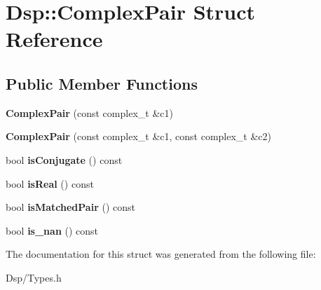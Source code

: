 \hypertarget{structDsp_1_1ComplexPair}{\section{Dsp\-:\-:Complex\-Pair Struct Reference}
\label{structDsp_1_1ComplexPair}
}
\subsection*{Public Member Functions}
\begin{DoxyCompactItemize}
\item 
\hypertarget{structDsp_1_1ComplexPair_a3bc3ac0d6dca14ea94ecb74f527ff28e}{{\bfseries Complex\-Pair} (const complex\-\_\-t \&c1)}\label{structDsp_1_1ComplexPair_a3bc3ac0d6dca14ea94ecb74f527ff28e}

\item 
\hypertarget{structDsp_1_1ComplexPair_a9ee530c01615a6d61330be1593e86157}{{\bfseries Complex\-Pair} (const complex\-\_\-t \&c1, const complex\-\_\-t \&c2)}\label{structDsp_1_1ComplexPair_a9ee530c01615a6d61330be1593e86157}

\item 
\hypertarget{structDsp_1_1ComplexPair_ac8d98cf07ef2c13a767c772b2fd55bda}{bool {\bfseries is\-Conjugate} () const }\label{structDsp_1_1ComplexPair_ac8d98cf07ef2c13a767c772b2fd55bda}

\item 
\hypertarget{structDsp_1_1ComplexPair_af45fbbc34d95c98aa4b58bac4f59ee1d}{bool {\bfseries is\-Real} () const }\label{structDsp_1_1ComplexPair_af45fbbc34d95c98aa4b58bac4f59ee1d}

\item 
\hypertarget{structDsp_1_1ComplexPair_acbb48ae2599c1a75cddae888bbee3398}{bool {\bfseries is\-Matched\-Pair} () const }\label{structDsp_1_1ComplexPair_acbb48ae2599c1a75cddae888bbee3398}

\item 
\hypertarget{structDsp_1_1ComplexPair_a142851f7fe4e3e1c17215b85834e1c6a}{bool {\bfseries is\-\_\-nan} () const }\label{structDsp_1_1ComplexPair_a142851f7fe4e3e1c17215b85834e1c6a}

\end{DoxyCompactItemize}


The documentation for this struct was generated from the following file\-:\begin{DoxyCompactItemize}
\item 
Dsp/Types.\-h\end{DoxyCompactItemize}
